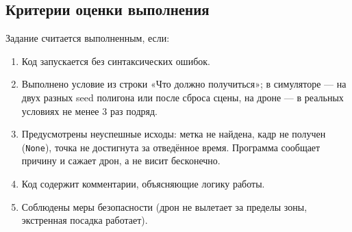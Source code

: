 \subsection{Критерии оценки выполнения}
Задание считается выполненным, если:
\begin{enumerate}
    \item Код запускается без синтаксических ошибок.
    \item Выполнено условие из строки «Что должно получиться»; в симуляторе --- на двух разных seed полигона или после сброса сцены, на дроне --- в реальных условиях не менее 3 раз подряд.
    \item Предусмотрены неуспешные исходы: метка не найдена, кадр не получен (\texttt{None}), точка не достигнута за отведённое время. Программа сообщает причину и сажает дрон, а не висит бесконечно.
    \item Код содержит комментарии, объясняющие логику работы.
    \item Соблюдены меры безопасности (дрон не вылетает за пределы зоны, экстренная посадка работает).
\end{enumerate}
